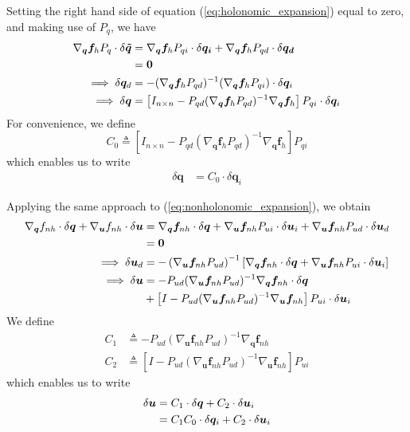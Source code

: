 \documentclass{svjour3}                     %
\begin{document}
Setting the right hand side of equation (\ref{eq:holonomic_expansion}) equal to
zero, and making use of $P_q$, we have
\begin{align}
  \nabla_{\bm{q}}\bm{f}_{h} P_{q} \cdot \delta \bm{\tilde{q}} &=
  \nabla_{\bm{q}}\bm{f}_{h} P_{qi} \cdot \delta \bm{q_i} +
  \nabla_{\bm{q}}\bm{f}_{h} P_{qd} \cdot \delta \bm{q_d}\notag\\
  &= \bm{0}\notag\\
  \implies \delta \bm{q}_d &= -(\nabla_{\bm{q}}\bm{f}_{h} P_{qd})^{-1}
  (\nabla_{\bm{q}}\bm{f}_{h} P_{qi}) \cdot \delta \bm{q}_i \notag\\
  \implies \delta \bm{q} &= \left[ I_{n \times n} - P_{qd}(\nabla_{\bm{q}}
    \bm{f}_{h} P_{qd})^{-1} \nabla_{\bm{q}} \bm{f}_{h} \right] P_{qi} \cdot \delta
    \bm{q}_i
\end{align}
For convenience, we define
\begin{equation}
  \label{eq:C_0}
  C_0 \triangleq \left[ I_{n \times n} - P_{qd}(\nabla_{\bm{q}}
    \bm{f}_{h} P_{qd})^{-1} \nabla_{\bm{q}} \bm{f}_{h} \right] P_{qi}
\end{equation}
which enables us to write
\begin{align}
  \label{eq:delta_q}
  \delta \bm{q} &= C_0 \cdot \delta \bm{q}_i
\end{align}

Applying the same approach to (\ref{eq:nonholonomic_expansion}), we obtain
\begin{align}
\nabla_{\bm{q}}f_{nh} \cdot \delta \bm{q} +
\nabla_{\bm{u}}f_{nh} \cdot \delta \bm{u} &= \nabla_{\bm{q}} \bm{f}_{nh} \cdot
\delta \bm{q} + \nabla_{\bm{u}} \bm{f}_{nh} P_{ui} \cdot \delta \bm{u}_i +
\nabla_{\bm{u}} \bm{f}_{nh} P_{ud} \cdot \delta \bm{u}_d \notag\\
&= \bm{0}\notag\\
\implies \delta \bm{u}_d &= -\left(\nabla_{\bm{u}} \bm{f}_{nh}
P_{ud}\right)^{-1}\left[\nabla_{\bm{q}}\bm{f}_{nh} \cdot \delta\bm{q} +
  \nabla_{\bm{u}} \bm{f}_{nh} P_{ui} \cdot \delta \bm{u}_i \right]\notag\\
  \implies \delta \bm{u} &= -P_{ud}(\nabla_{\bm{u}} \bm{f}_{nh} P_{ud})^{-1}
  \nabla_{\bm{q}} \bm{f}_{nh} \cdot \delta \bm{q}\notag\\
  &+ \left[I - P_{ud} (\nabla_{\bm{u}}\bm{f}_{nh} P_{ud})^{-1} \nabla_{\bm{u}}
    \bm{f}_{nh} \right] P_{ui} \cdot \delta \bm{u}_i
\end{align}
We define
\begin{align}
  \label{eq:C_1}
  C_1 &\triangleq -P_{ud}(\nabla_{\bm{u}} \bm{f}_{nh} P_{ud})^{-1}
  \nabla_{\bm{q}} \bm{f}_{nh} \\
  \label{eq:C_2}
  C_2 &\triangleq \left[I - P_{ud} (\nabla_{\bm{u}}\bm{f}_{nh} P_{ud})^{-1} \nabla_{\bm{u}}
    \bm{f}_{nh} \right] P_{ui}
\end{align}
which enables us to write
\begin{align}
  \label{eq:delta_u}
  \delta \bm{u} &= C_1 \cdot \delta \bm{q} + C_2 \cdot \delta \bm{u}_i\notag\\
  &= C_1 C_0 \cdot \delta \bm{q}_i + C_2 \cdot \delta \bm{u}_i
\end{align}
\end{document}
